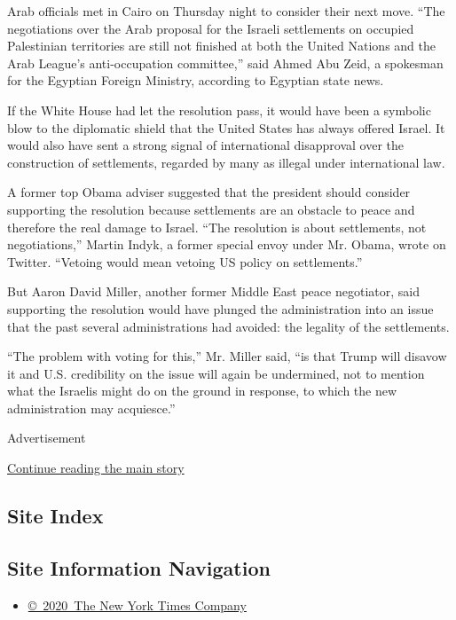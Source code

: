 Arab officials met in Cairo on Thursday night to consider their next
move. ``The negotiations over the Arab proposal for the Israeli
settlements on occupied Palestinian territories are still not finished
at both the United Nations and the Arab League's anti-occupation
committee,'' said Ahmed Abu Zeid, a spokesman for the Egyptian Foreign
Ministry, according to Egyptian state news.

If the White House had let the resolution pass, it would have been a
symbolic blow to the diplomatic shield that the United States has always
offered Israel. It would also have sent a strong signal of international
disapproval over the construction of settlements, regarded by many as
illegal under international law.

A former top Obama adviser suggested that the president should consider
supporting the resolution because settlements are an obstacle to peace
and therefore the real damage to Israel. ``The resolution is about
settlements, not negotiations,'' Martin Indyk, a former special envoy
under Mr. Obama, wrote on Twitter. ``Vetoing would mean vetoing US
policy on settlements.''

But Aaron David Miller, another former Middle East peace negotiator,
said supporting the resolution would have plunged the administration
into an issue that the past several administrations had avoided: the
legality of the settlements.

``The problem with voting for this,'' Mr. Miller said, ``is that Trump
will disavow it and U.S. credibility on the issue will again be
undermined, not to mention what the Israelis might do on the ground in
response, to which the new administration may acquiesce.''

Advertisement

\protect\hyperlink{after-bottom}{Continue reading the main story}

\hypertarget{site-index}{%
\subsection{Site Index}\label{site-index}}

\hypertarget{site-information-navigation}{%
\subsection{Site Information
Navigation}\label{site-information-navigation}}

\begin{itemize}
\tightlist
\item
  \href{https://help.nytimes3xbfgragh.onion/hc/en-us/articles/115014792127-Copyright-notice}{©~2020~The
  New York Times Company}
\end{itemize}

